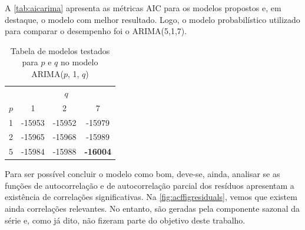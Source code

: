 \documentclass[
    12pt,
    oneside,
    a4paper,
    english,
    brazil
]{abntex2}
\begin{document}
A \autoref{tab:aicarima} apresenta as métricas AIC para os modelos propostos e,
em  destaque, o  modelo com  melhor  resultado. Logo,  o modelo  probabilístico
utilizado para comparar o desempenho foi o ARIMA(5,1,7).

\begin{table}[ht]
\centering
    \caption{Tabela de modelos testados para $p$ e $q$ no modelo ARIMA($p$, 1, $q$)}\label{tab:aicarima}
\begin{tabular}{l c c c}
                        & \multicolumn{3}{c}{$q$}           \\
    $p$                 & 1      & 2      & 7               \\
    \toprule
    1                   & -15953 & -15952 & -15979          \\
    2                   & -15965 & -15968 & -15989          \\
    5                   & -15984 & -15988 & \cellcolor[HTML]{AAAAAA}\textbf{-16004} \\
\end{tabular}
\end{table}

Para ser  possível concluir o modelo  como bom, deve-se, ainda,  analisar se as
funções de autocorrelação e de autocorrelação parcial dos resíduos apresentam a
existência  de  correlações significativas.  Na  \autoref{fig:acffigresiduals},
vemos que  existem ainda correlações  relevantes. No entanto, são  geradas pela
componente sazonal  da série  e, como  já dito, não  fizeram parte  do objetivo
deste trabalho.
\end{document}
